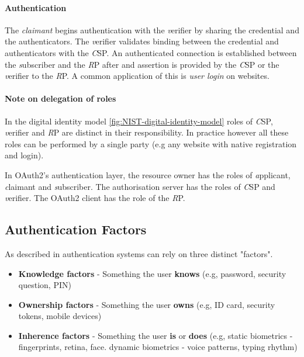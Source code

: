 \paragraph{Authentication} 
The \textit{claimant} begins authentication with the \textit verifier by sharing the credential and the authenticators. The \textit verifier validates binding between the credential and authenticators with the \textit CSP.
An authenticated connection is established between the \textit subscriber and the \textit RP after and assertion is provided by the \textit CSP or the \textit verifier to the \textit RP.
\bigskip
\newline
A common application of this is \textit{user login} on websites.

\paragraph{Note on delegation of roles}
In the digital identity model \ref{fig:NIST-digital-identity-model} roles of \textit CSP, \textit verifier and \textit RP are distinct in their responsibility. 
In practice however all these roles can be performed by a single party (e.g any website with native registration and login).

In OAuth2's \cite{hardt2012oauth} authentication layer, the resource owner has the roles of \textit applicant, \textit claimant and \textit subscriber. The authorisation server has the roles of \textit CSP and \textit verifier. The OAuth2 client has the role of the \textit RP.

\subsection{Authentication Factors}

As described in \cite{council2005authentication} authentication systems can rely on three distinct "factors".

\begin{itemize}
	\item \textbf{Knowledge factors} - Something the user \textbf{knows} (e.g, password, security question, PIN)
	\item \textbf{Ownership factors} - Something the user \textbf{owns} (e.g, ID card, security tokens, mobile devices)
	\item \textbf{Inherence factors} - Something the user \textbf{is} or \textbf{does} (e.g, static biometrics - fingerprints, retina, face. dynamic biometrics - voice patterns, typing rhythm)
\end{itemize}

